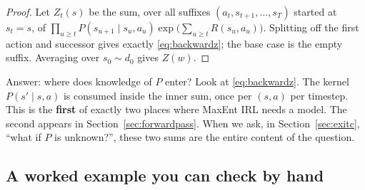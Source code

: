 \documentclass[11pt]{article}
\theoremstyle{plain}
\theoremstyle{definition}
\theoremstyle{remark}
\begin{document}
\begin{proof}
Let $Z_t(s)$ be the sum, over all suffixes $(a_t,s_{t+1},\ldots,s_T)$
started at $s_t=s$, of $\prod_{u\ge t} P(s_{u+1}\mid s_u,a_u)
\exp\big(\sum_{u\ge t} R(s_u,a_u)\big)$. Splitting off the first action and
successor gives exactly \eqref{eq:backwardz}; the base case is the empty
suffix. Averaging over $s_0\sim d_0$ gives $Z(w)$.
\end{proof}

\begin{graybox}{Answer: where does knowledge of $P$ enter?}
Look at \eqref{eq:backwardz}. The kernel $P(s'\mid s,a)$ is consumed
inside the inner sum, once per $(s,a)$ per timestep. This is the
\textbf{first} of exactly two places where MaxEnt IRL needs a model. The
second appears in Section~\ref{sec:forwardpass}. When we ask, in
Section~\ref{sec:exitc}, ``what if $P$ is unknown?'', these two sums are
the entire content of the question.
\end{graybox}

\subsection{A worked example you can check by hand}
\end{document}

